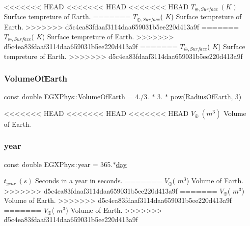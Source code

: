 <<<<<<< HEAD
<<<<<<< HEAD
<<<<<<< HEAD
$T_{\oplus,Surface}\ (K)$ Surface tempreture of Earth. \mbox{\label{namespace_e_g_x_phys_a73aaaddeacf5d59643ec5e4a53a1a251}} 
=======
$T_{\oplus,Surface}$( $K$) Surface tempreture of Earth. \mbox{\label{namespace_e_g_x_phys_a73aaaddeacf5d59643ec5e4a53a1a251}} 
>>>>>>> d5c4ea83fdaaf3114daa659031b5ee220d413a9f
=======
$T_{\oplus,Surface}$( $K$) Surface tempreture of Earth. \mbox{\label{namespace_e_g_x_phys_a73aaaddeacf5d59643ec5e4a53a1a251}} 
>>>>>>> d5c4ea83fdaaf3114daa659031b5ee220d413a9f
=======
$T_{\oplus,Surface}$( $K$) Surface tempreture of Earth. \mbox{\label{namespace_e_g_x_phys_a73aaaddeacf5d59643ec5e4a53a1a251}} 
>>>>>>> d5c4ea83fdaaf3114daa659031b5ee220d413a9f
\subsubsection{\texorpdfstring{Volume\+Of\+Earth}{VolumeOfEarth}}
{\footnotesize\ttfamily const double E\+G\+X\+Phys\+::\+Volume\+Of\+Earth = 4./3. $\ast$ 3. $\ast$ pow(\hyperlink{namespace_e_g_x_phys_a11a2d4a914eb43c4095e225358293a45}{Radius\+Of\+Earth}, 3)}

<<<<<<< HEAD
<<<<<<< HEAD
<<<<<<< HEAD
$V_\oplus\ (m^3)$ Volume of Earth. \mbox{\label{namespace_e_g_x_phys_afee9eebc1da4a1db2198fe0c45bcb53f}} 
\subsubsection{\texorpdfstring{year}{year}}
{\footnotesize\ttfamily const double E\+G\+X\+Phys\+::year = 365.$\ast$\hyperlink{namespace_e_g_x_phys_a24d985ae6f6cefe7e25ac40806b88f79}{day}}

$t_{year}\ (s)$ Seconds in a year in seconds. 
=======
$V_\oplus$( $m^3$) Volume of Earth. 
>>>>>>> d5c4ea83fdaaf3114daa659031b5ee220d413a9f
=======
$V_\oplus$( $m^3$) Volume of Earth. 
>>>>>>> d5c4ea83fdaaf3114daa659031b5ee220d413a9f
=======
$V_\oplus$( $m^3$) Volume of Earth. 
>>>>>>> d5c4ea83fdaaf3114daa659031b5ee220d413a9f
